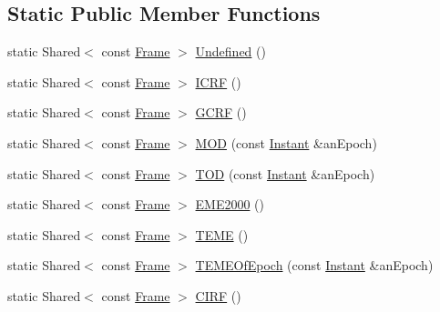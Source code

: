 \subsection*{Static Public Member Functions}
\begin{DoxyCompactItemize}
\item 
static Shared$<$ const \hyperlink{classostk_1_1physics_1_1coord_1_1_frame}{Frame} $>$ \hyperlink{classostk_1_1physics_1_1coord_1_1_frame_a292d32b849648a8e530d35ac47b5c699}{Undefined} ()
\item 
static Shared$<$ const \hyperlink{classostk_1_1physics_1_1coord_1_1_frame}{Frame} $>$ \hyperlink{classostk_1_1physics_1_1coord_1_1_frame_af111d96da6adf5405a354a769618b5f4}{I\+C\+RF} ()
\item 
static Shared$<$ const \hyperlink{classostk_1_1physics_1_1coord_1_1_frame}{Frame} $>$ \hyperlink{classostk_1_1physics_1_1coord_1_1_frame_abe31c60e3e7f654b101876cb6b9b5238}{G\+C\+RF} ()
\item 
static Shared$<$ const \hyperlink{classostk_1_1physics_1_1coord_1_1_frame}{Frame} $>$ \hyperlink{classostk_1_1physics_1_1coord_1_1_frame_a3d0822a703af130adbc1f93dfd1faad9}{M\+OD} (const \hyperlink{classostk_1_1physics_1_1time_1_1_instant}{Instant} \&an\+Epoch)
\item 
static Shared$<$ const \hyperlink{classostk_1_1physics_1_1coord_1_1_frame}{Frame} $>$ \hyperlink{classostk_1_1physics_1_1coord_1_1_frame_a433d54de1c22b08f1f8fe2574d468a59}{T\+OD} (const \hyperlink{classostk_1_1physics_1_1time_1_1_instant}{Instant} \&an\+Epoch)
\item 
static Shared$<$ const \hyperlink{classostk_1_1physics_1_1coord_1_1_frame}{Frame} $>$ \hyperlink{classostk_1_1physics_1_1coord_1_1_frame_a61b7c68b761966956251d393bf57f5e5}{E\+M\+E2000} ()
\item 
static Shared$<$ const \hyperlink{classostk_1_1physics_1_1coord_1_1_frame}{Frame} $>$ \hyperlink{classostk_1_1physics_1_1coord_1_1_frame_a1441cef9cd2abe312753f3a81606adfb}{T\+E\+ME} ()
\item 
static Shared$<$ const \hyperlink{classostk_1_1physics_1_1coord_1_1_frame}{Frame} $>$ \hyperlink{classostk_1_1physics_1_1coord_1_1_frame_ab47046bc517b04537c96844d95c13fdd}{T\+E\+M\+E\+Of\+Epoch} (const \hyperlink{classostk_1_1physics_1_1time_1_1_instant}{Instant} \&an\+Epoch)
\item 
static Shared$<$ const \hyperlink{classostk_1_1physics_1_1coord_1_1_frame}{Frame} $>$ \hyperlink{classostk_1_1physics_1_1coord_1_1_frame_ae858400dfa432f12b71712b52b3f5108}{C\+I\+RF} ()

\end{DoxyCompactItemize}
